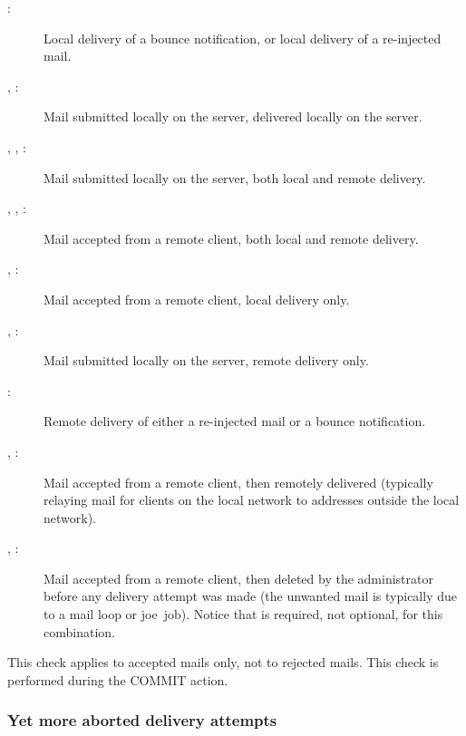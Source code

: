 \begin{description}

    \item [:] Local delivery of a bounce notification, or
        local delivery of a re-injected mail.

    \item [, :] Mail submitted locally on the
        server, delivered locally on the server.

    \item [, , :] Mail submitted
        locally \newline{} on the server, both local and remote delivery.

    \item [, , :] Mail accepted
        from a remote client, both local and remote delivery.

    \item [, :] Mail accepted from a remote
        client, local delivery only.

    \item [, :] Mail submitted locally on the
        server, remote delivery only.

    \item [:] Remote delivery of either a re-injected mail or
        a bounce notification.

    \item [, :] Mail accepted from a remote
        client, then remotely delivered (typically relaying mail for
        clients on the local network to addresses outside the local
        network).

    \item [, :] Mail accepted from a remote
        client, then deleted by the administrator before any delivery
        attempt was made (the unwanted mail is typically due to a mail loop
        or joe~job).  Notice that  is required, not
        optional, for this combination.

\end{description}

This check applies to accepted mails only, not to rejected mails.  This
check is performed during the COMMIT action.

\subsubsection{Yet more aborted delivery attempts}

